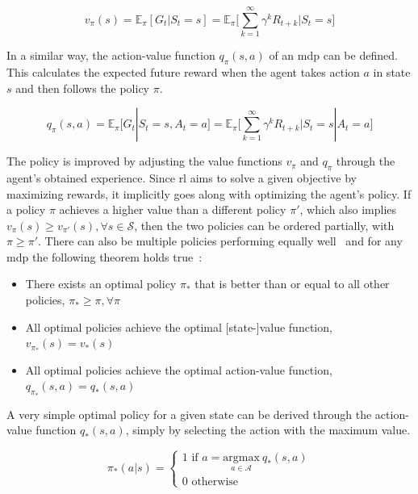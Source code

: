 \documentclass[draft,final]{vutinfth} %
\newcommand{\p}[1]{see p. #1}
\begin{document}
    \begin{equation}
        v_\pi(s) = \mathbb{E}_\pi[G_t|S_t = s] = \mathbb{E}_\pi \Bigg[\sum_{k=1}^{\infty} \gamma^k R_{t+k} \bigg| S_t = s \Bigg]\label{eq:value_function}
    \end{equation}

    In a similar way, the action-value function $q_\pi(s,a)$ of an \gls{mdp} can be defined.
    This calculates the expected future reward when the agent takes action $a$ in state $s$ and then follows the policy $\pi$.

    \begin{equation}
        q_\pi(s,a) = \mathbb{E}_\pi[G_t|S_t = s, A_t = a] = \mathbb{E}_\pi \Bigg[\sum_{k=1}^{\infty} \gamma^k R_{t+k} \bigg| S_t = s | A_t = a \Bigg]\label{eq:quality_function}
    \end{equation}

    The policy is improved by adjusting the value functions $v_\pi$ and $q_\pi$ through the agent's obtained experience.
    Since \gls{rl} aims to solve a given objective by maximizing rewards, it implicitly goes along with optimizing the agent's policy.
    If a policy $\pi$ achieves a higher value than a different policy $\pi'$, which also implies $v_\pi(s) \geq v_{\pi'}(s), \forall s \in \mathcal{S}$, then the two policies can be ordered partially, with $\pi \geq \pi'$.
    There can also be multiple policies performing equally well~\citep[\p{62f}]{sutton_reinforcement_2018} and for any \gls{mdp} the following theorem holds true~\citepOnline[\p{43}]{silver_lecture_2015-1}:

    \begin{itemize}
        \item There exists an optimal policy $\pi_*$ that is better than or equal to all other policies, $\pi_* \geq \pi, \forall\pi$
        \item All optimal policies achieve the optimal [state-]value function, $v_{\pi_*}(s) = v_*(s)$
        \item All optimal policies achieve the optimal action-value function, $q_{\pi_*}(s,a) = q_*(s,a)$
    \end{itemize}

    A very simple optimal policy for a given state can be derived through the action-value function $q_*(s,a)$, simply by selecting the action with the maximum value.

    \begin{equation}
        \pi_*(a|s) =
        \begin{cases}
            1 \text{ if } a =  \underset{a \in \mathcal{A}}{\text{argmax}}\ q_*(s,a)\\
            0 \text{ otherwise }
        \end{cases}
    \end{equation}
\end{document}
